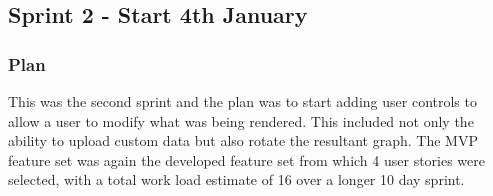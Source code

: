 \subsection{Sprint 2 - Start 4th January}
\subsubsection{Plan}
This was the second sprint and the plan was to start adding user controls to allow a user to modify what was being rendered. This included not only the ability to upload custom data but also rotate the resultant graph. The MVP feature set was again the developed feature set from which 4 user stories were selected, with a total work load estimate of 16 over a longer 10 day sprint.